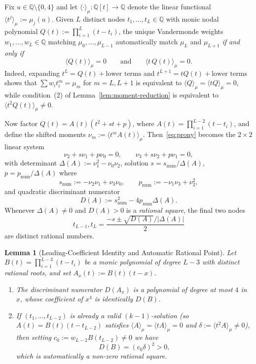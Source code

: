 \documentclass[11pt,a4paper]{article}
\newtheorem{lemma}[theorem]{Lemma}
\theoremstyle{definition}
\theoremstyle{remark}
\newcommand{\QQ}{\mathbb{Q}}
\begin{document}
Fix $u \in \QQ \setminus \{0, 4\}$ and let $\langle \cdot \rangle_\mu : \QQ[t] \to \QQ$ denote the linear functional $\langle t^j \rangle_\mu := \mu_j(u)$. Given $L$ distinct nodes $t_1, \dots, t_L \in \QQ$ with monic nodal polynomial $Q(t) := \prod_{i=1}^L (t - t_i)$, the unique Vandermonde weights $w_1, \dots, w_L \in \QQ$ matching $\mu_0, \dots, \mu_{L-1}$ automatically match $\mu_L$ and $\mu_{L+1}$ \emph{if and only if}
\begin{equation}
\label{eq:prony}
\langle Q(t) \rangle_\mu = 0 \qquad \text{and} \qquad \langle t\, Q(t) \rangle_\mu = 0.
\end{equation}
Indeed, expanding $t^L = Q(t) + \text{lower terms}$ and $t^{L+1} = t Q(t) + \text{lower terms}$ shows that $\sum w_i t_i^m = \mu_m$ for $m = L, L + 1$ is equivalent to $\langle Q \rangle_\mu = \langle t Q \rangle_\mu = 0$, while condition~(2) of Lemma~\ref{lem:moment-reduction} is equivalent to $\langle t^2 Q(t) \rangle_\mu \neq 0$.

Now factor $Q(t) = A(t)(t^2 + s t + p)$, where $A(t) = \prod_{i=1}^{L-2} (t - t_i)$, and define the shifted moments $\nu_m := \langle t^m A(t) \rangle_\mu$. Then~\eqref{eq:prony} becomes the $2 \times 2$ linear system
\[
\nu_2 + s \nu_1 + p \nu_0 = 0, \qquad \nu_3 + s \nu_2 + p \nu_1 = 0,
\]
with determinant $\Delta(A) := \nu_1^2 - \nu_0 \nu_2$, solution $s = s_{\mathrm{num}} / \Delta(A)$, $p = p_{\mathrm{num}} / \Delta(A)$ where
\[
s_{\mathrm{num}} := -\nu_2 \nu_1 + \nu_3 \nu_0, \qquad p_{\mathrm{num}} := -\nu_1 \nu_3 + \nu_2^2,
\]
and quadratic discriminant numerator
\begin{equation}
\label{eq:disc-D}
D(A) := s_{\mathrm{num}}^2 - 4 p_{\mathrm{num}} \Delta(A).
\end{equation}
Whenever $\Delta(A) \neq 0$ and $D(A) > 0$ is a \emph{rational square}, the final two nodes
\[
t_{L-1}, t_L = \frac{-s \pm \sqrt{D(A)} / |\Delta(A)|}{2}
\]
are distinct rational numbers.

\begin{lemma}[Leading-Coefficient Identity and Automatic Rational Point]
\label{lem:leading-coeff}
Let $B(t) = \prod_{i=1}^{L-3} (t - t_i)$ be a monic polynomial of degree $L - 3$ with distinct rational roots, and set $A_x(t) := B(t)(t - x)$.
\begin{enumerate}
\item[(1)] The discriminant numerator $D(A_x)$ is a polynomial of degree at most $4$ in $x$, whose coefficient of $x^4$ is identically $D(B)$.
\item[(2)] If $(t_1, \dots, t_{L-2})$ is already a valid $(k-1)$-solution (so $A(t) = B(t)(t - t_{L-2})$ satisfies $\langle A \rangle_\mu = \langle t A \rangle_\mu = 0$ and $\delta := \langle t^2 A \rangle_\mu \neq 0$), then setting $c_0 := w_{L-2} B(t_{L-2}) \neq 0$ we have
\[
D(B) = (c_0 \delta)^2 > 0,
\]
which is automatically a non-zero rational square.
\end{enumerate}
\end{lemma}
\end{document}
